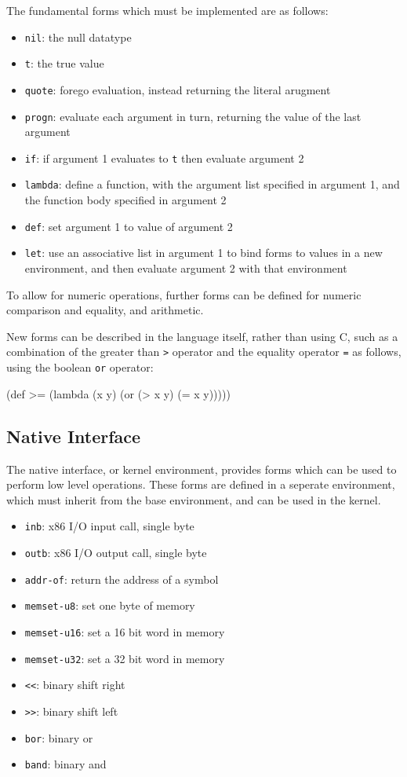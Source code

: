 \documentclass[10pt]{report}
\begin{document}
The fundamental forms which must be implemented are as follows:
\begin{itemize}
\item \texttt{nil}: the null datatype
\item \texttt{t}: the true value
\item \texttt{quote}: forego evaluation, instead returning the literal arugment
\item \texttt{progn}: evaluate each argument in turn, returning the value of the last argument
\item \texttt{if}: if argument 1 evaluates to \texttt{t} then evaluate argument 2
\item \texttt{lambda}: define a function, with the argument list specified in argument 1, and the function body specified in argument 2
\item \texttt{def}: set argument 1 to value of argument 2
\item \texttt{let}: use an associative list in argument 1 to bind forms to values in a new environment, and then evaluate argument 2 with that environment
\end{itemize}

To allow for numeric operations, further forms can be defined for numeric comparison and equality, and arithmetic.

New forms can be described in the language itself, rather than using C, such as a combination of the greater than \texttt{>} operator and the equality operator \texttt{=} as follows, using the boolean \texttt{or} operator:

\begin{texttt}
  (def >= (lambda (x y)
            (or (> x y)
                (= x y)))))
\end{texttt}

\subsection{Native Interface} \label{sec:kenv}
The native interface, or kernel environment, provides forms which can be used to perform low level operations. These forms are defined in a seperate environment, which must inherit from the base environment, and can be used in the kernel.

\begin{itemize}
\item \texttt{inb}: x86 I/O input call, single byte
\item \texttt{outb}: x86 I/O output call, single byte
\item \texttt{addr-of}: return the address of a symbol
\item \texttt{memset-u8}: set one byte of memory
\item \texttt{memset-u16}: set a 16 bit word in memory
\item \texttt{memset-u32}: set a 32 bit word in memory
\item \texttt{<<}: binary shift right
\item \texttt{>>}: binary shift left
\item \texttt{bor}: binary or
\item \texttt{band}: binary and
\end{itemize}
\end{document}
